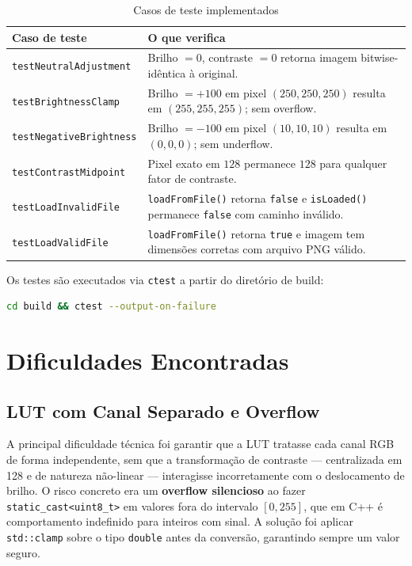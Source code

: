 \documentclass[12pt, a4paper]{article}
\begin{document}
\begin{table}[h!]
\centering
\caption{Casos de teste implementados}
\vspace{4pt}
\begin{tabularx}{\linewidth}{lX}
\toprule
Caso de teste & O que verifica \\
\midrule
\texttt{testNeutralAdjustment}
  & Brilho $= 0$, contraste $= 0$ retorna imagem bitwise-idêntica à original. \\
\texttt{testBrightnessClamp}
  & Brilho $= +100$ em pixel $(250, 250, 250)$ resulta em $(255, 255, 255)$;
    sem overflow. \\
\texttt{testNegativeBrightness}
  & Brilho $= -100$ em pixel $(10, 10, 10)$ resulta em $(0, 0, 0)$;
    sem underflow. \\
\texttt{testContrastMidpoint}
  & Pixel exato em $128$ permanece $128$ para qualquer fator de contraste. \\
\texttt{testLoadInvalidFile}
  & \texttt{loadFromFile()} retorna \texttt{false} e
    \texttt{isLoaded()} permanece \texttt{false} com caminho inválido. \\
\texttt{testLoadValidFile}
  & \texttt{loadFromFile()} retorna \texttt{true} e imagem tem dimensões
    corretas com arquivo PNG válido. \\
\bottomrule
\end{tabularx}
\end{table}

Os testes são executados via \texttt{ctest} a partir do diretório de build:

\begin{lstlisting}[language=bash, caption={Execução dos testes}]
cd build && ctest --output-on-failure
\end{lstlisting}

\section{Dificuldades Encontradas}

\subsection{LUT com Canal Separado e Overflow}

A principal dificuldade técnica foi garantir que a LUT tratasse cada canal RGB
de forma independente, sem que a transformação de contraste --- centralizada
em 128 e de natureza não-linear --- interagisse incorretamente com o
deslocamento de brilho. O risco concreto era um \textbf{overflow silencioso}
ao fazer \texttt{static\_cast<uint8\_t>} em valores fora do intervalo
$[0, 255]$, que em C++ é comportamento indefinido para inteiros com sinal. A
solução foi aplicar \texttt{std::clamp} sobre o tipo \texttt{double} antes da
conversão, garantindo sempre um valor seguro.
\end{document}
